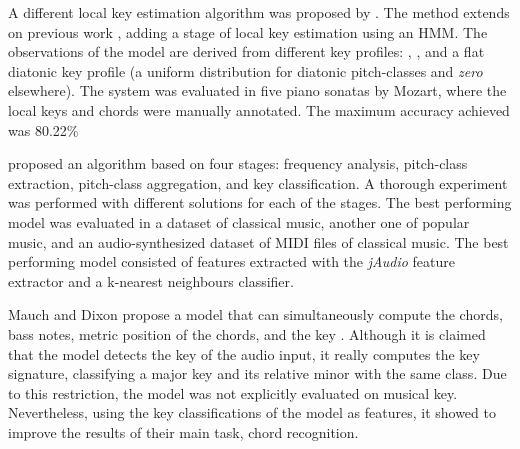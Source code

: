 A different local key estimation algorithm was proposed by
\textcite{papadopoulos2009local}. The method extends on
previous work \parencite{papadopoulos2008simultaneous},
adding a stage of local key estimation using an HMM. The
observations of the model are derived from different key
profiles: \textcite{krumhansl1982tracing},
\textcite{temperley1999whats}, and a flat diatonic key
profile (a uniform distribution for diatonic pitch-classes
and \emph{zero} elsewhere). The system was evaluated in five
piano sonatas by Mozart, where the local keys and chords
were manually annotated. The maximum accuracy achieved was
80.22\%

\textcite{campbell2010automatic} proposed an algorithm based
on four stages: frequency analysis, pitch-class extraction,
pitch-class aggregation, and key classification. A thorough
experiment was performed with different solutions for each
of the stages. The best performing model was evaluated in a
dataset of classical music, another one of popular music,
and an audio-synthesized dataset of MIDI files of classical
music. The best performing model consisted of features
extracted with the \emph{jAudio} feature extractor
\parencite{mcennis2005jaudio} and a k-nearest neighbours
classifier.

Mauch and Dixon propose a model that can simultaneously
compute the chords, bass notes, metric position of the
chords, and the key \textcite{mauch2010simultaneous}.
Although it is claimed that the model detects the key of the
audio input, it really computes the key signature,
classifying a major key and its relative minor with the same
class. Due to this restriction, the model was not explicitly
evaluated on musical key. Nevertheless, using the key
classifications of the model as features, it showed to
improve the results of their main task, chord recognition.











